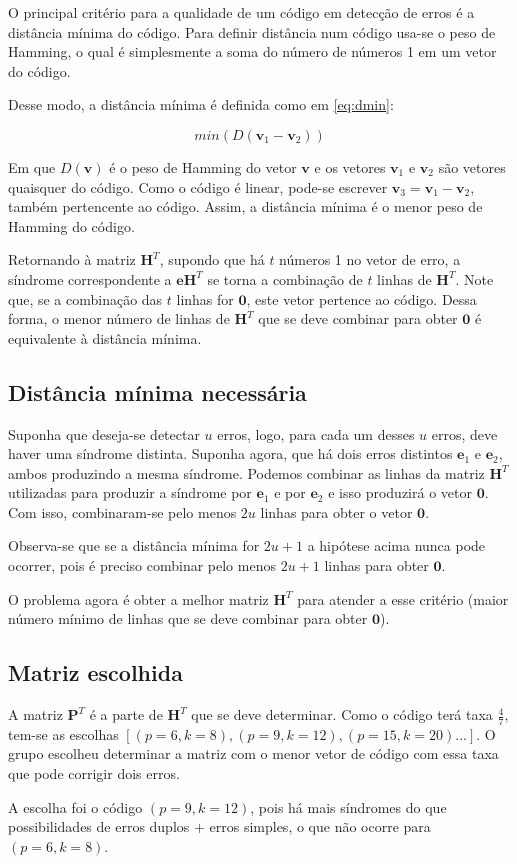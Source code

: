 O principal critério para a qualidade de um código em detecção de erros é a distância mínima do código. Para definir distância num código usa-se o peso de Hamming, o qual é simplesmente a soma do número de números 1 em um vetor do código.

Desse modo, a distância mínima é definida como em \ref{eq:dmin}:

\begin{equation}
	min(D(\textbf{v}_1-\textbf{v}_2))
	\label{eq:dmin}
\end{equation}

 Em que $D(\textbf{v})$ é o peso de Hamming do vetor $\textbf{v}$ e os vetores $\textbf{v}_1$ e $\textbf{v}_2$ são vetores quaisquer do código. Como o código é linear, pode-se escrever $\textbf{v}_3 = \textbf{v}_1-\textbf{v}_2$, também pertencente ao código. Assim, a distância mínima é o menor peso de Hamming do código.

Retornando à matriz $\textbf{H}^T$, supondo que há $t$ números 1 no vetor de erro, a síndrome correspondente a $\textbf{e}\textbf{H}^T$ se torna a combinação de $t$ linhas de $\textbf{H}^T$. Note que, se a combinação das $t$ linhas for $\textbf{0}$, este vetor pertence ao código. Dessa forma, o menor número de linhas de $\textbf{H}^T$ que se deve combinar para obter $\textbf{0}$ é equivalente à distância mínima.

\subsection{Distância mínima necessária}

Suponha que deseja-se detectar $u$ erros, logo, para cada um desses $u$ erros, deve haver uma síndrome distinta. Suponha agora, que há dois erros distintos $\textbf{e}_1$ e $\textbf{e}_2$, ambos produzindo a mesma síndrome. Podemos combinar as linhas da matriz $\textbf{H}^T$ utilizadas para produzir a síndrome por $\textbf{e}_1$ e por $\textbf{e}_2$ e isso produzirá o vetor $\textbf{0}$. Com isso, combinaram-se pelo menos $2u$ linhas para obter o vetor $\textbf{0}$.

Observa-se que se a distância mínima for $2u+1$ a hipótese acima nunca pode ocorrer, pois é preciso combinar pelo menos $2u+1$ linhas para obter $\textbf{0}$.

O problema agora é obter a melhor matriz $\textbf{H}^T$ para atender a esse critério (maior número mínimo de linhas que se deve combinar para obter $\textbf{0}$).

\subsection{Matriz escolhida}

A matriz $\textbf{P}^T$ é a parte de $\textbf{H}^T$ que se deve determinar. Como o código terá taxa $\frac{4}{7}$, tem-se as escolhas $[(p=6, k=8), (p=9, k=12), (p=15, k=20)...]$. O grupo escolheu determinar a matriz com o menor vetor de código com essa taxa que pode corrigir dois erros.

A escolha foi o código $(p=9, k=12)$, pois há mais síndromes do que possibilidades de erros duplos + erros simples, o que não ocorre para $(p=6, k=8)$.